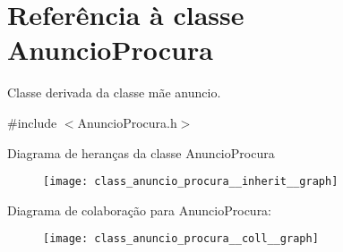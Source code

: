 \hypertarget{class_anuncio_procura}{\section{Referência à classe Anuncio\+Procura}
\label{class_anuncio_procura}
}


Classe derivada da classe mãe anuncio.  




{\ttfamily \#include $<$Anuncio\+Procura.\+h$>$}



Diagrama de heranças da classe Anuncio\+Procura\nopagebreak
\begin{figure}[H]
\begin{center}
\leavevmode
\texttt{[image: class\_anuncio\_procura\_\_inherit\_\_graph]}
\end{center}
\end{figure}


Diagrama de colaboração para Anuncio\+Procura\+:\nopagebreak
\begin{figure}[H]
\begin{center}
\leavevmode
\texttt{[image: class\_anuncio\_procura\_\_coll\_\_graph]}
\end{center}
\end{figure}
